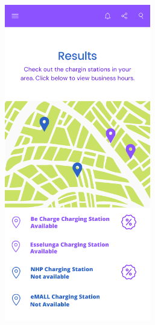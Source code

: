 \documentclass[12pt]{report}
\begin{document}
\begin{figure}[h]
\begin{subfigure}{0.49\textwidth}
        \centering
        \includegraphics[width = 0.7\textwidth]{assets/ui2.png}
        \end{subfigure}
         \begin{subfigure}{0.49\textwidth}
        \centering

\end{subfigure}
\end{figure}
\end{document}
